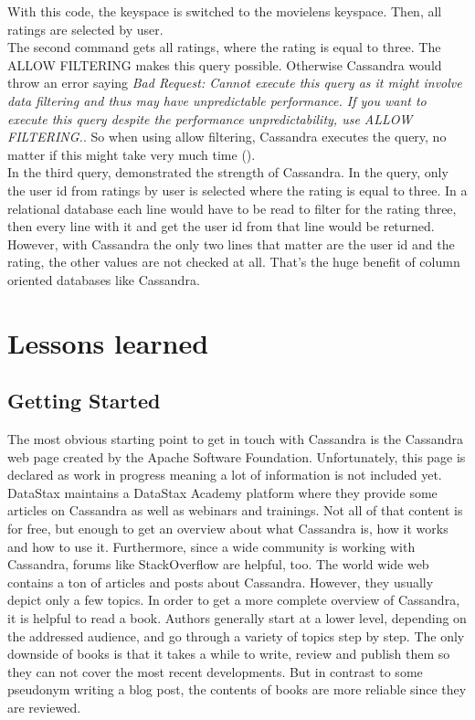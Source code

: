 With this code, the keyspace is switched to the movielens keyspace. Then, all ratings are selected by user.  \\
The second command gets all ratings, where the rating is equal to three. The ALLOW FILTERING makes this query possible. Otherwise Cassandra would throw an error saying \textit{Bad Request: Cannot execute this query as it might involve data filtering and thus may have unpredictable performance. If you want to execute this query despite the performance unpredictability, use ALLOW FILTERING.}. So when using allow filtering, Cassandra executes the query, no matter if this might take very much time (\cite{cassAllowFiltering}). \\
In the third query, demonstrated the strength of Cassandra. In the query, only the user id from ratings by user is selected where the rating is equal to three. In a relational database each line would have to be read to filter for the rating three, then every line with it and get the user id from that line would be returned. However, with Cassandra the only two lines that matter are the user id and the rating, the other values are not checked at all. That's the huge benefit of column oriented databases like Cassandra.

\clearpage
\section{Lessons learned}
\subsection{Getting Started}
The most obvious starting point to get in touch with Cassandra is the Cassandra web page created by the Apache Software Foundation. Unfortunately, this page is declared as work in progress meaning a lot of information is not included yet. DataStax maintains a DataStax Academy platform where they provide some articles on Cassandra as well as webinars and trainings. Not all of that content is for free, but enough to get an overview about what Cassandra is, how it works and how to use it. Furthermore, since a wide community is working with Cassandra, forums like StackOverflow are helpful, too. The world wide web contains a ton of articles and posts about Cassandra. However, they usually depict only a few topics. In order to get a more complete overview of Cassandra, it is helpful to read a book. Authors generally start at a lower level, depending on the addressed audience, and go through a variety of topics step by step. The only downside of books is that it takes a while to write, review and publish them so they can not cover the most recent developments. But in contrast to some pseudonym writing a blog post, the contents of books are more reliable since they are reviewed.

